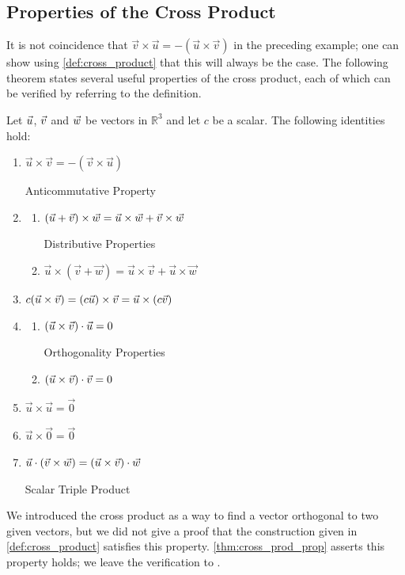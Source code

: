 \subsection{Properties of the Cross Product}

It is not coincidence that $\vec v\times\vec u = -(\vec u\times\vec v)$ in the preceding example; one can show using \autoref{def:cross_product} that this will always be the case. The following theorem states several useful properties of the cross product, each of which can be verified by referring to the definition.

{
\begin{theorem}\label{thm:cross_prod_prop}%
Let $\vec u$, $\vec v$ and $\vec w$ be vectors in $\mathbb{R}^3$ and let $c$ be a scalar. The following identities hold:
\begin{enumerate}
	\item \parbox{167pt}{$\vec u\times\vec v = -(\vec v\times\vec u)$} Anticommutative Property
	\item	\begin{enumerate}
		\item \parbox{145pt}{$(\vec u+\vec v)\times \vec w = \vec u\times\vec w+\vec v\times\vec w$} Distributive Properties
		\item	$\vec u \times (\vec v+\vec w) = \vec u\times\vec v+\vec u\times\vec w$
	\end{enumerate}
	\item		$c(\vec u\times\vec v) = (c\vec u) \times \vec v = \vec u \times (c\vec v)$
	\item		\begin{enumerate}
		\item \parbox{145pt}{$(\vec u\times\vec v)\cdot \vec u = 0$} Orthogonality Properties
		\item	$(\vec u\times\vec v)\cdot \vec v = 0$
	\end{enumerate}
	\item		$\vec u\times\vec u = \vec 0$
	\item		$\vec u\times\vec0 = \vec 0$
	\item		\parbox{167pt}{$\vec u \cdot (\vec v\times\vec w) = (\vec u\times\vec v)\cdot \vec w$} Scalar Triple Product
\end{enumerate}
\end{theorem}
}

We introduced the cross product as a way to find a vector orthogonal to two given vectors, but we did not give a proof that the construction given in \autoref{def:cross_product} satisfies this property. \autoref{thm:cross_prod_prop} asserts this property holds; we leave the verification to .

